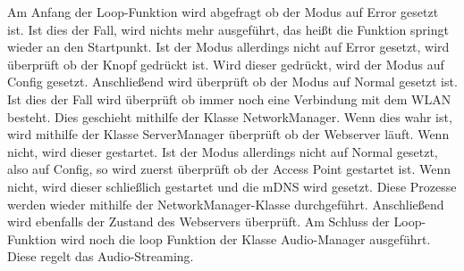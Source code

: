 \documentclass[]{article}
\begin{document}
Am Anfang der Loop-Funktion wird abgefragt ob der Modus auf Error gesetzt ist. Ist dies der Fall, wird nichts mehr ausgeführt, das heißt die Funktion springt wieder an den Startpunkt. Ist der Modus allerdings nicht auf Error gesetzt, wird überprüft ob der Knopf gedrückt ist. Wird dieser gedrückt, wird der Modus auf Config gesetzt. Anschließend wird überprüft ob der Modus auf Normal gesetzt ist. Ist dies der Fall wird überprüft ob immer noch eine Verbindung mit dem WLAN besteht. Dies geschieht mithilfe der Klasse NetworkManager. Wenn dies wahr ist, wird mithilfe der Klasse ServerManager überprüft ob der Webserver läuft. Wenn nicht, wird dieser gestartet. Ist der Modus allerdings nicht auf Normal gesetzt, also auf Config, so wird zuerst überprüft ob der Access Point gestartet ist. Wenn nicht, wird dieser schließlich gestartet und die mDNS wird gesetzt. Diese Prozesse werden wieder mithilfe der NetworkManager-Klasse durchgeführt. Anschließend wird ebenfalls der Zustand des Webservers überprüft. Am Schluss der Loop-Funktion wird noch die loop Funktion der Klasse Audio-Manager ausgeführt. Diese regelt das Audio-Streaming.
\end{document}
